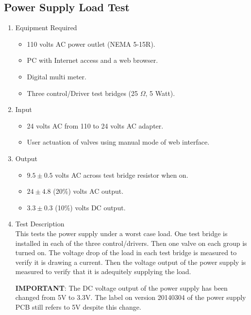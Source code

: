 \documentclass{article}
\begin{document}
\subsection{Power Supply Load Test}

\begin{enumerate}
\item Equipment Required
	\begin{itemize}
	\item 110 volts AC power outlet (NEMA 5-15R).
	\item PC with Internet access and a web browser.
	\item Digital multi meter.
	\item Three control/Driver test bridges (25 $\Omega$, 5 Watt).
	\end{itemize}
\item Input
	\begin{itemize}
	\item 24 volts AC from 110 to 24 volts AC adapter.
	\item User actuation of valves using manual mode of web interface.
	\end{itemize}
\item Output
	\begin{itemize}
	\item $9.5\pm0.5$ volts AC across test bridge resistor when on.
	\item $24\pm4.8$ (20\%) volts AC output.
	\item $3.3\pm0.3$ (10\%) volts DC output.
	\end{itemize}
\item Test Description \\

This tests the power supply under a worst case load.
One test bridge is installed in each of the three control/drivers.
Then one valve on each group is turned on.
The voltage drop of the load in each test bridge is measured to
verify it is drawing a current.
Then the voltage output of the power supply is measured to verify
that it is adequitely supplying the load.

\begin{framed}
\textbf{IMPORTANT}: The DC voltage output of the power supply has
been changed from 5V to 3.3V.
The label on version 20140304 of the power supply PCB still
refers to 5V despite this change.
\end{framed}


\end{enumerate}
\end{document}
